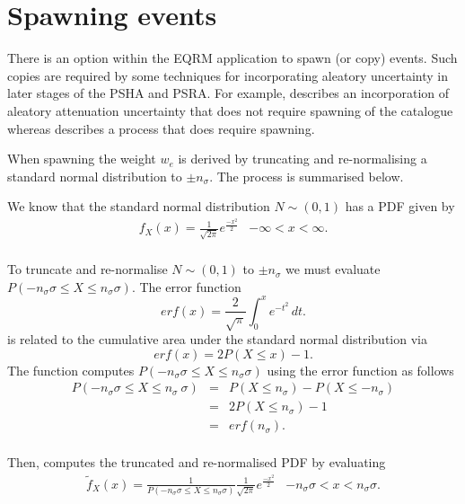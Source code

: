 \section{Spawning events}
\label{source:spawning}


There is an option within the EQRM application to spawn (or copy)
events. Such copies are required by some techniques for
incorporating aleatory uncertainty in later stages of the PSHA and
PSRA. For example,  describes an
incorporation of aleatory attenuation uncertainty that does not
require spawning of the catalogue whereas
 describes a process that does require
spawning. 

When spawning the weight $w_e$ is derived by
truncating and re-normalising a standard normal distribution to
$\pm n_\sigma$. The process is summarised below.

We know that the standard normal distribution $ N \sim (0,1)$ has
a PDF given by
\begin{equation}
\begin{array}{lr}
f_X(x)=\frac{1}{\sqrt{2\pi}}e^{\frac{-x^2}{2}} & - \infty <x<
\infty.
\\
\end{array}
\end{equation}

To truncate and re-normalise $N \sim (0,1)$ to $\pm n_\sigma$ we
must evaluate $P(-n_\sigma \sigma \leq X \leq n_\sigma \sigma)$.
The error function
\begin{equation}
erf(x) = \frac{2}{\sqrt{\pi}} \int_{0}^{x} e^{-t^2} \, dt.
\end{equation}
is related to the cumulative area under the standard normal
distribution via
\begin{equation}
erf(x) = 2P(X \leq x)-1.
\end{equation}
The function  computes $P(-n_\sigma
\sigma \leq X \leq n_\sigma \sigma)$ using the error function as
follows
\begin{equation}
\begin{array}{rcl}
P(-n_\sigma \sigma \leq X \leq n_\sigma\ \sigma)  & = & P(X \leq
n_\sigma)-P(X \leq -n_\sigma) \\
   & = & 2P(X \leq n_\sigma)-1 \\
    & = & erf(n_\sigma) . \\
\end{array}
\end{equation}

Then,  computes the truncated and
re-normalised PDF by evaluating
\begin{equation}
\begin{array}{lr}
\tilde{f}_X(x)= \frac{1}{P(-n_\sigma \sigma \leq X \leq n_\sigma
\sigma)}
\frac{1}{\sqrt{2\pi}}e^{ \frac{-x^2}{2}} & -n_\sigma \sigma <x< n_\sigma \sigma. \\
\end{array}
\end{equation}

